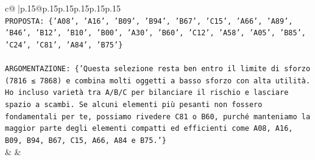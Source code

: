 \documentclass{article}
\begin{document}
{\begin{supertabular}{c@{$\;$}|p{.15\linewidth}@{}p{.15\linewidth}p{.15\linewidth}p{.15\linewidth}p{.15\linewidth}p{.15\linewidth}}
{{{\\ 
\texttt{PROPOSTA: \{'A08', 'A16', 'B09', 'B94', 'B67', 'C15', 'A66', 'A89', 'B46', 'B12', 'B10', 'B00', 'A30', 'B60', 'C12', 'A58', 'A05', 'B85', 'C24', 'C81', 'A84', 'B75'\}} \\
\\ 
\texttt{ARGOMENTAZIONE: \{'Questa selezione resta ben entro il limite di sforzo (7816 ≤ 7868) e combina molti oggetti a basso sforzo con alta utilità. Ho incluso varietà tra A/B/C per bilanciare il rischio e lasciare spazio a scambi. Se alcuni elementi più pesanti non fossero fondamentali per te, possiamo rivedere C81 o B60, purché manteniamo la maggior parte degli elementi compatti ed efficienti come A08, A16, B09, B94, B67, C15, A66, A84 e B75.'\}} \\
            }
        }
    }
    & & \\ \\


\end{supertabular}}
\end{document}
